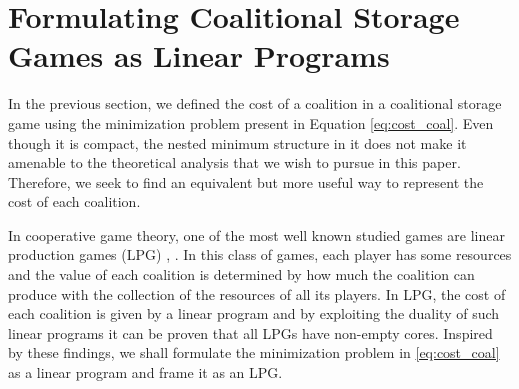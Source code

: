 
\section{Formulating Coalitional Storage Games as Linear Programs}

In the previous section, we defined the cost of a coalition in a coalitional storage game using the minimization problem present in Equation \eqref{eq:cost_coal}. Even though it is compact, the nested minimum structure in it does not make it amenable to the theoretical analysis that we wish to pursue in this paper. Therefore, we seek to find an equivalent but more useful way to represent the cost of each coalition.

In cooperative game theory, one of the most well known studied games are linear production games (LPG) \cite{Borm2001}, \cite{Owen1975}. In this class of games, each player has some resources and the value of each coalition is determined by how much the coalition can produce with the collection of the resources of all its players.
In LPG, the cost of each coalition is given by a linear program and by exploiting the duality of such linear programs it can be proven that all LPGs have non-empty cores. 
Inspired by these findings, we shall formulate the minimization problem in \eqref{eq:cost_coal} as a linear program and frame it as an LPG.






